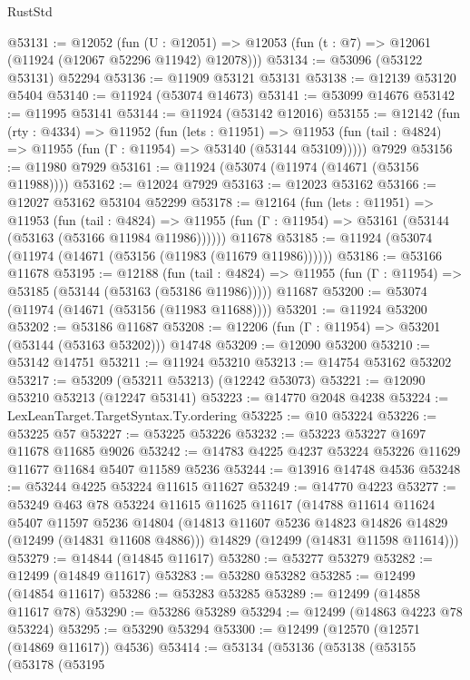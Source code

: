 \begin{lexlean}{RustStd}
\begin{coremodule}
@53131 := @12052
    (fun (U : @12051) => @12053 (fun (t : @7) => @12061 (@11924 (@12067 @52296 @11942) @12078)))
@53134 := @53096 (@53122 @53131) @52294
@53136 := @11909 @53121 @53131
@53138 := @12139 @53120 @5404
@53140 := @11924 (@53074 @14673)
@53141 := @53099 @14676
@53142 := @11995 @53141
@53144 := @11924 (@53142 @12016)
@53155 := @12142
    (fun (rty : @4334) =>
    @11952
      (fun (lets : @11951) =>
      @11953 (fun (tail : @4824) => @11955 (fun (Γ : @11954) => @53140 (@53144 @53109)))))
    @7929
@53156 := @11980 @7929
@53161 := @11924 (@53074 (@11974 (@14671 (@53156 @11988))))
@53162 := @12024 @7929
@53163 := @12023 @53162
@53166 := @12027 @53162 @53104 @52299
@53178 := @12164
    (fun (lets : @11951) =>
    @11953
      (fun (tail : @4824) =>
      @11955 (fun (Γ : @11954) => @53161 (@53144 (@53163 (@53166 @11984 @11986))))))
    @11678
@53185 := @11924 (@53074 (@11974 (@14671 (@53156 (@11983 (@11679 @11986))))))
@53186 := @53166 @11678
@53195 := @12188
    (fun (tail : @4824) => @11955 (fun (Γ : @11954) => @53185 (@53144 (@53163 (@53186 @11986)))))
    @11687
@53200 := @53074 (@11974 (@14671 (@53156 (@11983 @11688))))
@53201 := @11924 @53200
@53202 := @53186 @11687
@53208 := @12206 (fun (Γ : @11954) => @53201 (@53144 (@53163 @53202))) @14748
@53209 := @12090 @53200
@53210 := @53142 @14751
@53211 := @11924 @53210
@53213 := @14754 @53162 @53202
@53217 := @53209 (@53211 @53213) (@12242 @53073)
@53221 := @12090 @53210 @53213 (@12247 @53141)
@53223 := @14770 @2048 @4238
@53224 := LexLeanTarget.TargetSyntax.Ty.ordering
@53225 := @10 @53224
@53226 := @53225 @57
@53227 := @53225 @53226
@53232 := @53223 @53227 @1697 @11678 @11685 @9026
@53242 := @14783 @4225 @4237 @53224 @53226 @11629 @11677 @11684 @5407 @11589 @5236
@53244 := @13916 @14748 @4536
@53248 := @53244 @4225 @53224 @11615 @11627
@53249 := @14770 @4223
@53277 := @53249
    @463
    @78
    @53224
    @11615
    @11625
    @11617
    (@14788
      @11614
      @11624
      @5407
      @11597
      @5236
      @14804
      (@14813 @11607 @5236 @14823 @14826 @14829 (@12499 (@14831 @11608 @4886)))
      @14829
      (@12499 (@14831 @11598 @11614)))
@53279 := @14844 (@14845 @11617)
@53280 := @53277 @53279
@53282 := @12499 (@14849 @11617)
@53283 := @53280 @53282
@53285 := @12499 (@14854 @11617)
@53286 := @53283 @53285
@53289 := @12499 (@14858 @11617 @78)
@53290 := @53286 @53289
@53294 := @12499 (@14863 @4223 @78 @53224)
@53295 := @53290 @53294
@53300 := @12499 (@12570 (@12571 (@14869 @11617)) @4536)
@53414 := @53134
    (@53136
      (@53138
        (@53155
          (@53178
            (@53195

\end{coremodule}
\end{lexlean}
